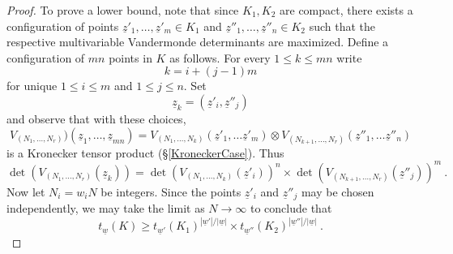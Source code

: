 \documentclass[10pt]{amsart}
\theoremstyle{definition}
\theoremstyle{remark}
\numberwithin{equation}{section}
\newcommand{\z}{\underline{z}}
\newcommand{\0}{\color{blue}{\mathsf{0}}}
\begin{document}
\begin{proof}
To prove a lower bound,  note that since $K_1, K_2$ are compact, there exists a configuration of points $\z'_1,\ldots, \z'_{m} \in K_1$ and $\z''_1,\ldots, \z''_n \in K_2$ such that 
the respective multivariable Vandermonde determinants are maximized.  
Define a configuration of $mn$ points in $K$ as follows. For every  $1\leq k \leq mn$ write
\[ k= i+ (j-1)  m  \]
for unique  $1\leq  i \leq m$ and $1\leq j\leq n$. Set 
\[ \z_k = (\z'_i, \z''_j)\]
and observe that with these choices, 
\[ V_{(N_1,\ldots, N_r)}) (\z_1,\ldots, \z_{mn}) =  V_{(N_1,\ldots, N_k)} (\z'_1,\ldots \z'_m) \otimes  V_{(N_{k+1},\ldots, N_r)} (\z''_1,\ldots \z''_n) \]
is a Kronecker tensor product (\S \ref{KroneckerCase}). Thus 
\[ \det( V_{(N_1,\ldots, N_r)} (\z_k )  )=  \det( V_{(N_1,\ldots, N_k)} (\z'_i))^{n}  \times \det( V_{(N_{k+1},\ldots, N_r)} (\z''_j))^m  \ .  \]
Now let $N_i = w_i N$ be  integers.   Since the points $\z'_i$  and $\z''_j$ may be chosen independently, we may take the limit as $N\rightarrow \infty$ to conclude that
\[   t_{\underline{w}} (K) \geq  t_{\underline{w}'} (K_1)^{|\underline{w}'|/|\underline{w}|} \times t_{{\underline{w}''}}(K_2)^{|\underline{w}''|/|\underline{w}|}\ .  \]
\end{proof} 











  
\end{document}
